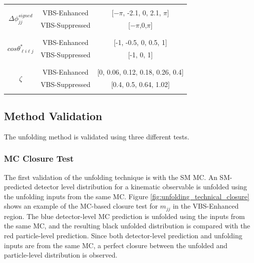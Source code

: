 \begin{table}
\begin{center}
\begin{tabular}{ | c | c | c | }
    & &\\
    \hline
    \multirow{4}{*}{ $\Delta \phi_{jj}^{signed}$ } &  &  \\
    & VBS-Enhanced & [$-\pi$, -2.1, 0, 2.1, $\pi$] \\
    & VBS-Suppressed & [$-\pi$,0,$\pi$] \\
    & & \\
    \hline
    \multirow{4}{*}{ $cos \theta_{\ell i\ell j}^{\ast}$ } &  &  \\
    & VBS-Enhanced & [-1, -0.5, 0, 0.5, 1] \\
    & VBS-Suppressed & [-1, 0, 1]\\
    & & \\
    \hline
    \multirow{4}{*}{ $\zeta$ } &  &  \\
    & VBS-Enhanced &[0, 0.06, 0.12, 0.18, 0.26, 0.4] \\
    & VBS-Suppressed & [0.4, 0.5, 0.64, 1.02]\\
    & &\\
    \hline
    \end{tabular}
    \end{center}
\end{table}

\subsection{Method Validation}
\label{subsec:UnfoldingValidation}
The unfolding method is validated using three different tests.

\subsubsection{MC Closure Test}
\label{subsubsec:MCClosure}

The first validation of the unfolding technique is with the SM MC. An SM-predicted detector level distribution for a kinematic observable is unfolded using the unfolding inputs from the same MC. Figure \ref{fig:unfolding_technical_closure} shows an example of the MC-based closure test for $m_{jj}$ in the VBS-Enhanced region. The blue detector-level MC prediction is unfolded using the inputs from the same MC, and the resulting black unfolded distribution is compared with the red particle-level prediction. Since both detector-level prediction and unfolding inputs are from the same MC, a perfect closure between the unfolded and particle-level distribution is observed.

